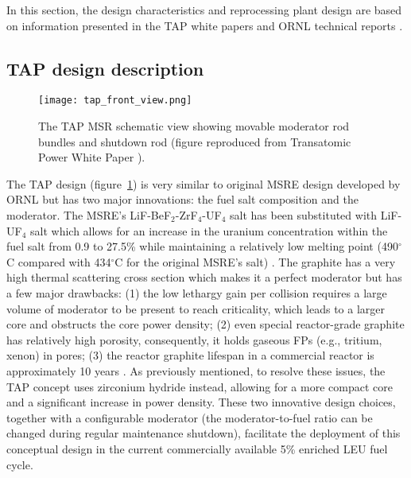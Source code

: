 In this section, the design characteristics and reprocessing plant design are 
based on
information presented in the TAP white papers  
\cite{transatomic_power_corporation_technical_2016, 
transatomic_power_corporation_neutronics_2016} and \gls{ORNL} technical 
reports \cite{betzler_two-dimensional_2017, betzler_assessment_2017}.

\subsection{TAP design description}
\begin{figure}[h] %
	  		\hspace{+2.2in}
	\texttt{[image: tap\_front\_view.png]}
	\caption{The \gls{TAP} \gls{MSR} schematic view showing movable moderator 
		rod 
		bundles and shutdown rod (figure reproduced from Transatomic Power 
		White Paper 
		\cite{transatomic_power_corporation_technical_2016}).}
	\label{fig:tap-main-view}
\end{figure}
The \gls{TAP} design (figure~\ref{fig:tap-main-view}) is very similar to 
original \gls{MSRE} design developed by \gls{ORNL} 
\cite{haubenreich_experience_1970} but has two major innovations: 
the fuel salt composition and the moderator. The \gls{MSRE}'s 
LiF-BeF$_2$-ZrF$_4$-UF$_4$ salt has been substituted with LiF-UF$_4$ salt 
which allows for an increase in the uranium concentration within the fuel salt 
from 0.9 to 27.5\% while maintaining a relatively low melting point 
(490$^{\circ}$C compared with 434$^{\circ}$C for the original \gls{MSRE}'s 
salt) \cite{betzler_two-dimensional_2017}. The graphite has a very high 
thermal scattering cross section which makes it a perfect moderator but has 
a few major drawbacks: 
(1) the low lethargy gain per collision requires a large volume of moderator 
to be present to reach criticality, which leads to a larger core and obstructs 
the core power density; (2) even special 
reactor-grade graphite has relatively high porosity, consequently, it holds
gaseous \glspl{FP} 
(e.g., tritium, xenon) in pores; (3) the reactor graphite lifespan in a 
commercial 
reactor is approximately 10 years \cite{robertson_conceptual_1971}. As previously 
mentioned, to resolve these issues, the \gls{TAP} concept uses zirconium 
hydride instead, allowing for a more compact core and a significant increase 
in power density. These two innovative design choices, together with a 
configurable moderator (the moderator-to-fuel ratio can be changed during 
regular maintenance shutdown), facilitate the deployment of this conceptual 
design in the current commercially available 5\% enriched \gls{LEU} fuel cycle. 

